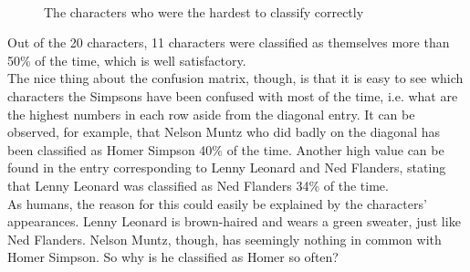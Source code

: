 \documentclass[journal, a4paper]{IEEEtran}
\begin{document}
\\
\begin{figure}
\hfill
{}\hfill
{}
\caption{The characters who were the hardest to classify correctly}
\end{figure}
Out of the 20 characters, 11 characters were classified as themselves more than 50\% of the time, which is well satisfactory. 
\\
The nice thing about the confusion matrix, though, is that it is easy to see which characters the Simpsons have been confused with most of the time, i.e. what are the highest numbers in each row aside from the diagonal entry. It can be observed, for example, that Nelson Muntz who did badly on the diagonal has been classified as Homer Simpson 40\% of the time. Another high value can be found in the entry corresponding to Lenny Leonard and Ned Flanders, stating that Lenny Leonard was classified as Ned Flanders 34\% of the time. 
\\
As humans, the reason for this could easily be explained by the characters' appearances. Lenny Leonard is brown-haired and wears a green sweater, just like Ned Flanders. Nelson Muntz, though, has seemingly nothing in common with Homer Simpson. So why is he classified as Homer so often?
\end{document}
